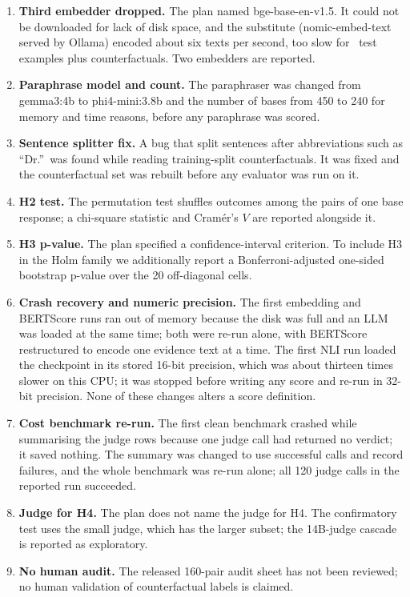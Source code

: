 \begin{enumerate}\setlength{\itemsep}{0pt}
\item \textbf{Third embedder dropped.} The plan named bge-base-en-v1.5. It could not be downloaded for lack of disk space, and the substitute (nomic-embed-text served by Ollama) encoded about six texts per second, too slow for \NTestNatural\ test examples plus counterfactuals. Two embedders are reported.
\item \textbf{Paraphrase model and count.} The paraphraser was changed from gemma3:4b to phi4-mini:3.8b and the number of bases from 450 to 240 for memory and time reasons, before any paraphrase was scored.
\item \textbf{Sentence splitter fix.} A bug that split sentences after abbreviations such as ``Dr.''\ was found while reading training-split counterfactuals. It was fixed and the counterfactual set was rebuilt before any evaluator was run on it.
\item \textbf{H2 test.} The permutation test shuffles outcomes among the pairs of one base response; a chi-square statistic and Cram\'er's $V$ are reported alongside it.
\item \textbf{H3 p-value.} The plan specified a confidence-interval criterion. To include H3 in the Holm family we additionally report a Bonferroni-adjusted one-sided bootstrap p-value over the 20 off-diagonal cells.
\item \textbf{Crash recovery and numeric precision.} The first embedding and BERTScore runs ran out of memory because the disk was full and an LLM was loaded at the same time; both were re-run alone, with BERTScore restructured to encode one evidence text at a time. The first NLI run loaded the checkpoint in its stored 16-bit precision, which was about thirteen times slower on this CPU; it was stopped before writing any score and re-run in 32-bit precision. None of these changes alters a score definition.
\item \textbf{Cost benchmark re-run.} The first clean benchmark crashed while summarising the judge rows because one judge call had returned no verdict; it saved nothing. The summary was changed to use successful calls and record failures, and the whole benchmark was re-run alone; all 120 judge calls in the reported run succeeded.
\item \textbf{Judge for H4.} The plan does not name the judge for H4. The confirmatory test uses the small judge, which has the larger subset; the 14B-judge cascade is reported as exploratory.
\item \textbf{No human audit.} The released 160-pair audit sheet has not been reviewed; no human validation of counterfactual labels is claimed.
\end{enumerate}

